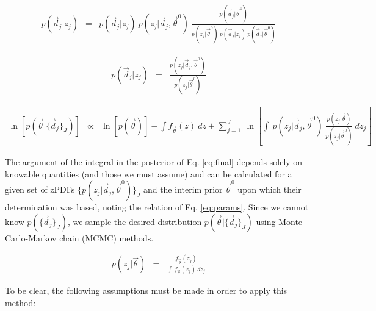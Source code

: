 \documentclass[preprint]{aastex}
\begin{document}
\begin{eqnarray}
\label{eq:indterm}
p(\vec{d}_{j}|z_{j}) &=& p(\vec{d}_{j}|z_{j})\ p(z_{j}|\vec{d}_{j},\vec{\theta}^{0})\ \frac{p(\vec{d}_{j}|\vec{\theta}^{0})}{p(z_{j}|\vec{\theta}^{0})\ p(\vec{d}_{j}|z_{j})\ p(\vec{d}_{j}|\vec{\theta}^{0})}
\end{eqnarray}

\begin{eqnarray}
\label{eq:cancel}
p(\vec{d}_{j}|z_{j}) &=& \frac{p(z_{j}|\vec{d}_{j},\vec{\theta}^{0})}{p(z_{j}|\vec{\theta}^{0})}
\end{eqnarray}

\begin{eqnarray}
\label{eq:final}
\ln[p(\vec{\theta}|\{\vec{d}_{j}\}_{J})] &\propto& \ln[p(\vec{\theta})]-\int f_{\vec{\theta}}(z)\ dz + \sum_{j=1}^{J}\ \ln\left[\int\ p(z_{j}|\vec{d}_{j},\vec{\theta}^{0})\ \frac{p(z_{j}|\vec{\theta})}{p(z_{j}|\vec{\theta}^{0})}\ dz_{j}\right]
\end{eqnarray}

The argument of the integral in the posterior of Eq. \ref{eq:final} depends solely on knowable quantities (and those we must assume) and can be calculated for a given set of zPDFs $\{p(z_{j}|\vec{d}_{j},\vec{\theta}^{0})\}_{J}$ and the interim prior $\vec{\theta}^{0}$ upon which their determination was based, noting the relation of Eq. \ref{eq:params}.  Since we cannot know $p(\{\vec{d}_{j}\}_{J})$, we sample the desired distribution $p(\vec{\theta}|\{\vec{d}_{j}\}_{J})$ using Monte Carlo-Markov chain (MCMC) methods.  

\begin{eqnarray}
\label{eq:params}
p(z_{j}|\vec{\theta}) &=& \frac{f_{\vec{\theta}}(z_{j})}{\int\ f_{\vec{\theta}}(z_{j})\ dz_{j}}
\end{eqnarray}

To be clear, the following assumptions must be made in order to apply this method:
\end{document}
